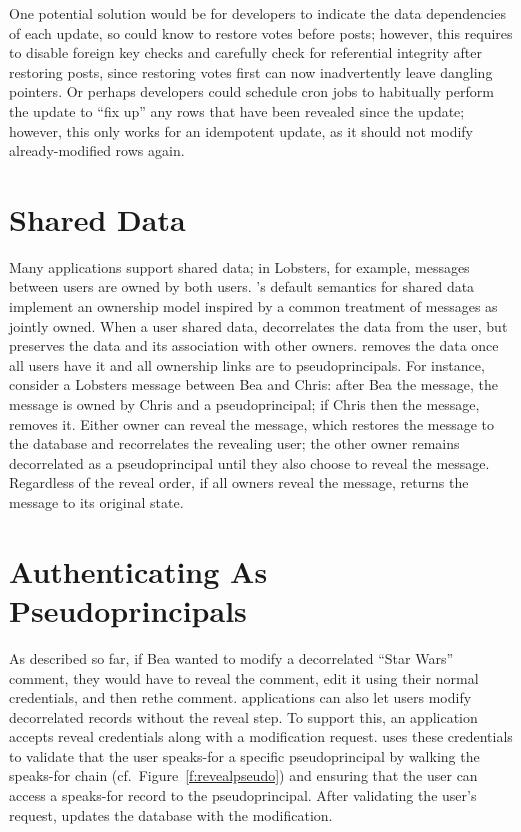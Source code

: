 %
One potential solution would be for developers to indicate the data dependencies
of each update, so \sys could know to restore votes before posts; however, this
requires \sys to disable foreign key checks and carefully check for referential
integrity after restoring posts, since restoring votes first can now
inadvertently leave dangling pointers. Or perhaps developers could schedule cron
jobs to habitually perform the update to ``fix up'' any rows that have been
revealed since the update; however, this only works for an idempotent update, as
it should not modify already-modified rows again.
%

\section{Shared Data}
\label{s:shared}
%
Many applications support shared data; in Lobsters, for example, messages
between users are owned by both users.
%
\sys's default semantics for shared data implement an ownership model inspired
by a common treatment of messages as jointly owned.
%
When a user \xxs shared data, \sys decorrelates the data from the \xxing user,
but preserves the data and its association with other owners.
%
\sys removes the data once all users have \xxed it and all ownership links are
to pseudoprincipals.
%
For instance, consider a Lobsters message between Bea and Chris: after Bea \xxs
the message, the message is owned by Chris and a pseudoprincipal; if Chris then
\xxs the message, \sys removes it.
%
Either owner can reveal the message, which restores the message to the database
and recorrelates the revealing user; the other owner remains decorrelated as a
pseudoprincipal until they also choose to reveal the message.
%
Regardless of the reveal order, if all owners reveal the message, \sys returns
the message to its original state.
%





\section{Authenticating As Pseudoprincipals}

As described so far, if Bea wanted to modify a decorrelated ``Star Wars''
comment, they would have to reveal the comment, edit it using their normal
credentials, and then re\xx the comment.
%
\sys applications can also let users modify decorrelated records without the
reveal step.
%
To support this, an application accepts reveal credentials along with a
modification request. \sys uses these credentials to validate that the user
speaks-for a specific pseudoprincipal by walking the speaks-for chain (cf.\
Figure~\ref{f:revealpseudo}) and ensuring that the user can access a speaks-for
record to the pseudoprincipal. After validating the user's request, \sys updates
the database with the modification.
%
%

